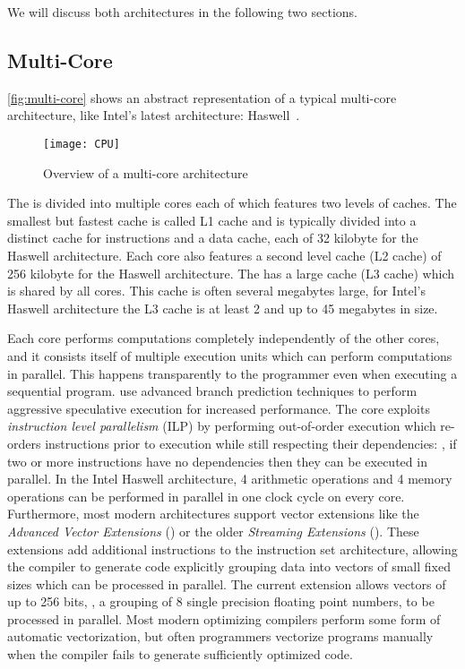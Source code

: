 We will discuss both architectures in the following two sections.

\subsection{Multi-Core \CPUs}
\autoref{fig:multi-core} shows an abstract representation of a typical multi-core \CPU architecture, like Intel's latest \CPU architecture: Haswell~\cite{IntelHaswell}.
\begin{figure}
  \centering
  \texttt{[image: CPU]}
  \caption{Overview of a multi-core \CPU architecture}
  \label{fig:multi-core}
\end{figure}
The \CPU is divided into multiple cores each of which features two levels of caches.
The smallest but fastest cache is called L1 cache and is typically divided into a distinct cache for instructions and a data cache, each of 32 kilobyte for the Haswell architecture.
Each core also features a second level cache (L2 cache) of 256 kilobyte for the Haswell architecture.
The \CPU has a large cache (L3 cache) which is shared by all cores.
This cache is often several megabytes large, for Intel's Haswell architecture the L3 cache is at least 2 and up to 45 megabytes in size.

Each \CPU core performs computations completely independently of the other cores, and it consists itself of multiple execution units which can perform computations in parallel.
This happens transparently to the programmer even when executing a sequential program.
\CPUs use advanced branch prediction techniques to perform aggressive speculative execution for increased performance.
The \CPU core exploits \emph{instruction level parallelism} (ILP) by performing out-of-order execution which re-orders instructions prior to execution while still respecting their dependencies:
\eg, if two or more instructions have no dependencies then they can be executed in parallel.
In the Intel Haswell architecture, 4 arithmetic operations and 4 memory operations can be performed in parallel in one clock cycle on every core.
Furthermore, most modern \CPU architectures support \SIMD vector extensions like the \emph{Advanced Vector Extensions} (\AVX) or the older \emph{Streaming \SIMD Extensions} (\SSE).
These extensions add additional instructions to the instruction set architecture, allowing the compiler to generate code explicitly grouping data into vectors of small fixed sizes which can be processed in parallel.
The current \AVX extension allows vectors of up to 256 bits, \eg, a grouping of 8 single precision floating point numbers, to be processed in parallel.
Most modern optimizing compilers perform some form of automatic vectorization, but often programmers vectorize programs manually when the compiler fails to generate sufficiently optimized code.

